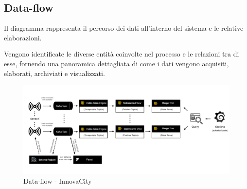 \subsection{Data-flow}
Il diagramma rappresenta il percorso dei dati all'interno del sistema e le relative elaborazioni.

Vengono identificate le diverse entità coinvolte nel processo e le relazioni tra di esse, fornendo una panoramica dettagliata di come i dati vengono acquisiti, elaborati, archiviati e visualizzati.

\begin{figure}[H]
    \centering
    \includegraphics[width=1\textwidth]{../Images/SpecificaTecnica/data_flow.jpg}
    \caption{Data-flow - InnovaCity}
    \label{fig: dataflow}
\end{figure}

